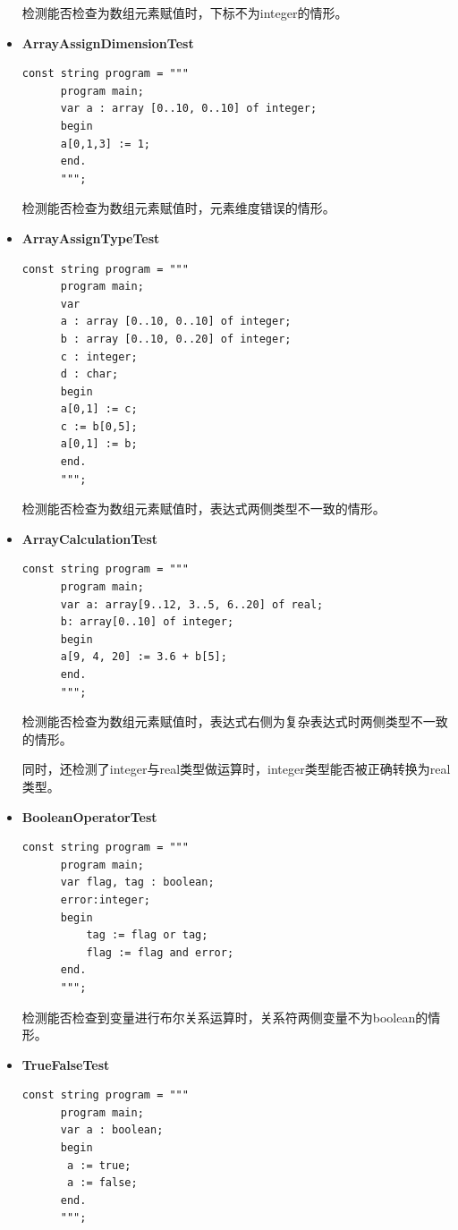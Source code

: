 \documentclass[../main.tex]{subfiles}
\begin{document}
\begin{itemize}
检测能否检查为数组元素赋值时，下标不为integer的情形。

    \item \textbf{ArrayAssignDimensionTest}
    \begin{lstlisting}[style=csharp]
const string program = """
      program main;
      var a : array [0..10, 0..10] of integer;
      begin
      a[0,1,3] := 1;
      end.
      """;      
    \end{lstlisting}
    
检测能否检查为数组元素赋值时，元素维度错误的情形。

    \item \textbf{ArrayAssignTypeTest}
    \begin{lstlisting}[style=csharp]
const string program = """
      program main;
      var
      a : array [0..10, 0..10] of integer;
      b : array [0..10, 0..20] of integer;
      c : integer;
      d : char;
      begin
      a[0,1] := c;
      c := b[0,5];
      a[0,1] := b;
      end.
      """;
    \end{lstlisting}

检测能否检查为数组元素赋值时，表达式两侧类型不一致的情形。

    \item \textbf{ArrayCalculationTest}
    \begin{lstlisting}[style=csharp]
const string program = """
      program main;
      var a: array[9..12, 3..5, 6..20] of real;
      b: array[0..10] of integer;
      begin
      a[9, 4, 20] := 3.6 + b[5];
      end.
      """;    
    \end{lstlisting}

检测能否检查为数组元素赋值时，表达式右侧为复杂表达式时两侧类型不一致的情形。

同时，还检测了integer与real类型做运算时，integer类型能否被正确转换为real类型。

    \item \textbf{BooleanOperatorTest}
    \begin{lstlisting}[style=csharp]
const string program = """
      program main;
      var flag, tag : boolean;
      error:integer;
      begin
          tag := flag or tag;
          flag := flag and error;
      end.
      """;
    \end{lstlisting}

检测能否检查到变量进行布尔关系运算时，关系符两侧变量不为boolean的情形。

    \item \textbf{TrueFalseTest}
    \begin{lstlisting}[style=csharp]
const string program = """
      program main;
      var a : boolean;
      begin
       a := true;
       a := false;
      end.
      """;
    \end{lstlisting}


\end{itemize}
\end{document}
